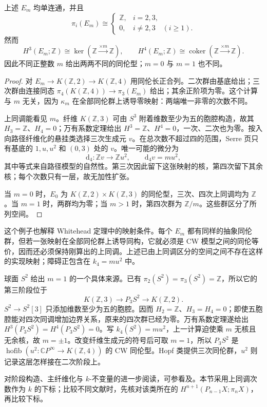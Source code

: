 \begin{example}\label{g2:exm:postnikov-two-stage-family}
	上述 \(E_m\) 均单连通，并且
	\[
		\pi_i(E_m)\cong
		\begin{cases}
			\mathbb Z,&i=2,3,\\
			0,&i\ne2,3\quad(i\ge1).
		\end{cases}
	\]
	然而
	\[
		H^3(E_m;\mathbb Z)\cong\ker(\mathbb Z\xrightarrow{\times m}\mathbb Z),\qquad
		H^4(E_m;\mathbb Z)\cong\operatorname{coker}(\mathbb Z\xrightarrow{\times m}\mathbb Z).
	\]
	因此不同正整数 \(m\) 给出两两不同的同伦型；\(m=0\) 与 \(m=1\) 也不同。
\end{example}
\begin{proof}
	对 \(E_m\to K(\mathbb Z,2)\to K(\mathbb Z,4)\) 用同伦长正合列。二次群由基底给出；三次群由连接同态 \(\pi_4(K(\mathbb Z,4))\to\pi_3(E_m)\) 给出；其余正阶项为零。这个计算与 \(m\) 无关，因为 \(\kappa_m\) 在全部同伦群上诱导零映射：两端唯一非零的次数不同。

	上同调能看见 \(m\)。纤维 \(K(\mathbb Z,3)\) 可由 \(S^3\) 附着维数至少为五的胞腔构造，故其 \(H_3=\mathbb Z\)、\(H_4=0\)；万有系数定理给出 \(H^3=\mathbb Z\)、\(H^4=0\)，一次、二次也为零。按入向路径纤维化的悬挂类选择三次生成元 \(v\)。在总次数不超过四的范围，Serre 页只有基底的 \(1,u,u^2\) 和 \((0,3)\) 处的 \(v\)。唯一可能的微分为
	\[
		\mathrm d_4:\mathbb Zv\longrightarrow\mathbb Zu^2,\qquad \mathrm d_4v=m u^2,
	\]
	其中等式来自路径模型的自然性。第三次因此留下这张映射的核，第四次留下其余核；每个次数只有一层，故无加性扩张。

	当 \(m=0\) 时，\(E_0\) 为 \(K(\mathbb Z,2)\times K(\mathbb Z,3)\) 的同伦型，三次、四次上同调均为 \(\mathbb Z\)。当 \(m=1\) 时，两群均为零；当 \(m>1\) 时，第四次群为 \(\mathbb Z/m\)。这些群区分了所列空间。
\end{proof}

这个例子也解释 Whitehead 定理中的映射条件。每个 \(E_m\) 都有同样的抽象同伦群，但若一张映射在全部同伦群上诱导同构，它就必须是 CW 模型之间的同伦等价，因而还必须保持刚算出的上同调。上述已由上同调区分的空间之间不存在这样的实现映射；障碍正包含在 \(k_4=m u^2\) 中。

\ProseParagraphBreak

球面 \(S^2\) 给出 \(m=1\) 的一个具体来源。已有 \(\pi_2(S^2)=\pi_3(S^2)=\mathbb Z\)，所以它的第三阶段位于
\[
	K(\mathbb Z,3)\longrightarrow P_3S^2\longrightarrow K(\mathbb Z,2).
\]
\(S^2\to S^2[3]\) 只添加维数至少为五的胞腔。因而 \(H_2=\mathbb Z\)、\(H_3=H_4=0\)；即使五胞腔能对四次同调增加边界关系，原来的四次群已经为零。万有系数定理遂给出 \(H^3(P_3S^2)=H^4(P_3S^2)=0\)。写 \(k_4(S^2)=m u^2\)，上一计算迫使乘 \(m\) 无核且无余核，故 \(m=\pm1\)。改变纤维生成元的符号后可取 \(m=1\)，所以 \(P_3S^2\) 是 \(\operatorname{hofib}(u^2:\mathbb CP^\infty\to K(\mathbb Z,4))\) 的 CW 同伦型。Hopf 类提供三次同伦群，\(u^2\) 则记录这层怎样接在二次阶段上。

\ProseParagraphBreak

对阶段构造、主纤维化与 \(k\)-不变量的进一步阅读，可参看\cite[第4.3节，Postnikov Towers]{Hatcher2002}及\cite[第22章第4节，Postnikov systems]{May1999}。本节采用上同调次数作为 \(k\) 的下标；比较不同文献时，先核对该类所在的 \(H^{n+1}(P_{n-1}X;\pi_nX)\)，再比较下标。
